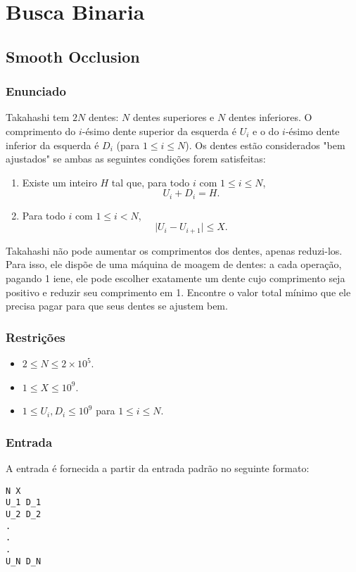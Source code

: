\section{Busca Binaria}

\subsection{Smooth Occlusion}

\subsubsection*{Enunciado}
Takahashi tem \(2N\) dentes: \(N\) dentes superiores e \(N\) dentes inferiores.
O comprimento do \(i\)-ésimo dente superior da esquerda é \(U_i\) e o do \(i\)-ésimo dente inferior da esquerda é \(D_i\) (para \(1 \le i \le N\)).
Os dentes estão considerados "bem ajustados" se ambas as seguintes condições forem satisfeitas:
\begin{enumerate}
    \item Existe um inteiro \(H\) tal que, para todo \(i\) com \(1 \le i \le N\),
    \[
    U_i + D_i = H.
    \]
    \item Para todo \(i\) com \(1 \le i < N\),
    \[
    \lvert U_i - U_{i+1} \rvert \le X.
    \]
\end{enumerate}

Takahashi não pode aumentar os comprimentos dos dentes, apenas reduzi-los.
Para isso, ele dispõe de uma máquina de moagem de dentes: a cada operação, pagando 1 iene, ele pode escolher exatamente um dente cujo comprimento seja positivo e reduzir seu comprimento em 1.
Encontre o valor total mínimo que ele precisa pagar para que seus dentes se ajustem bem.

\subsubsection*{Restrições}
\begin{itemize}
    \item \(2 \le N \le 2 \times 10^5\).
    \item \(1 \le X \le 10^9\).
    \item \(1 \le U_i, D_i \le 10^9\) para \(1 \le i \le N\).
\end{itemize}

\subsubsection*{Entrada}
A entrada é fornecida a partir da entrada padrão no seguinte formato:
\begin{verbatim}
N X
U_1 D_1
U_2 D_2
.
.
.
U_N D_N
\end{verbatim}

